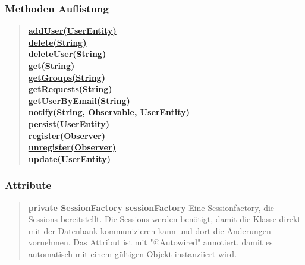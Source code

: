 \documentclass[11pt,a4paper]{article}
\begin{document}
{{{{{{{{{{{{{\subsubsection{Methoden Auflistung}{
\begin{verse}
\hyperlink{edu.kit.pse17.go_app.PersistenceLayer.daos.UserDaoImp.addUser(edu.kit.pse17.go_app.PersistenceLayer.UserEntity)}{{\bf addUser(UserEntity)}} \\
\hyperlink{edu.kit.pse17.go_app.PersistenceLayer.daos.UserDaoImp.delete(java.lang.String)}{{\bf delete(String)}} \\
\hyperlink{edu.kit.pse17.go_app.PersistenceLayer.daos.UserDaoImp.deleteUser(java.lang.String)}{{\bf deleteUser(String)}} \\
\hyperlink{edu.kit.pse17.go_app.PersistenceLayer.daos.UserDaoImp.get(java.lang.String)}{{\bf get(String)}} \\
\hyperlink{edu.kit.pse17.go_app.PersistenceLayer.daos.UserDaoImp.getGroups(java.lang.String)}{{\bf getGroups(String)}} \\
\hyperlink{edu.kit.pse17.go_app.PersistenceLayer.daos.UserDaoImp.getRequests(java.lang.String)}{{\bf getRequests(String)}} \\
\hyperlink{edu.kit.pse17.go_app.PersistenceLayer.daos.UserDaoImp.getUserByEmail(java.lang.String)}{{\bf getUserByEmail(String)}} \\
\hyperlink{edu.kit.pse17.go_app.PersistenceLayer.daos.UserDaoImp.notify(java.lang.String, edu.kit.pse17.go_app.ServiceLayer.Observable, edu.kit.pse17.go_app.PersistenceLayer.UserEntity)}{{\bf notify(String, Observable, UserEntity)}} \\
\hyperlink{edu.kit.pse17.go_app.PersistenceLayer.daos.UserDaoImp.persist(edu.kit.pse17.go_app.PersistenceLayer.UserEntity)}{{\bf persist(UserEntity)}} \\
\hyperlink{edu.kit.pse17.go_app.PersistenceLayer.daos.UserDaoImp.register(edu.kit.pse17.go_app.ServiceLayer.Observer)}{{\bf register(Observer)}} \\
\hyperlink{edu.kit.pse17.go_app.PersistenceLayer.daos.UserDaoImp.unregister(edu.kit.pse17.go_app.ServiceLayer.Observer)}{{\bf unregister(Observer)}} \\
\hyperlink{edu.kit.pse17.go_app.PersistenceLayer.daos.UserDaoImp.update(edu.kit.pse17.go_app.PersistenceLayer.UserEntity)}{{\bf update(UserEntity)}} \\
\end{verse}
}
\subsubsection{Attribute}{
\begin{verse}
{{\bf private SessionFactory sessionFactory}} Eine Sessionfactory, die Sessions bereitstellt. Die Sessions werden benötigt, damit die Klasse direkt mit der Datenbank
      kommunizieren kann und dort die Änderungen vornehmen. Das Attribut ist mit "@Autowired" annotiert, damit es automatisch
     mit einem gültigen Objekt instanziiert wird.
     

\end{verse}}}}}}}}}}}}}}}
\end{document}
